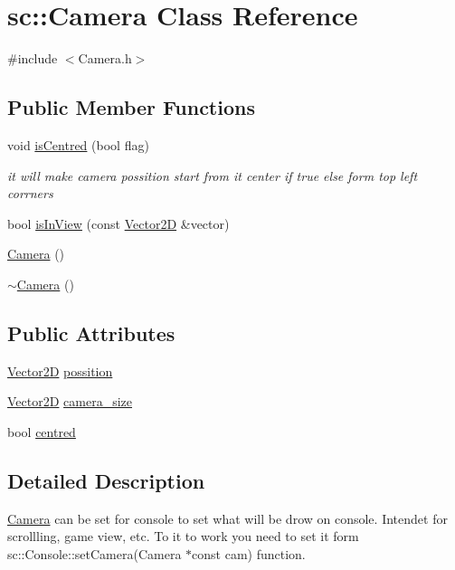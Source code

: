 \hypertarget{classsc_1_1_camera}{}\section{sc\+::Camera Class Reference}
\label{classsc_1_1_camera}


{\ttfamily \#include $<$Camera.\+h$>$}

\subsection*{Public Member Functions}
\begin{DoxyCompactItemize}
\item 
void \mbox{\hyperlink{classsc_1_1_camera_a11435e666d8d36637823263b1d494ffb}{is\+Centred}} (bool flag)
\begin{DoxyCompactList}\small\item\em it will make camera possition start from it center if true else form top left corrners \end{DoxyCompactList}\item 
bool \mbox{\hyperlink{classsc_1_1_camera_a6b737853f54514a30700f4ff27433995}{is\+In\+View}} (const \mbox{\hyperlink{classsc_1_1_vector2_d}{Vector2D}} \&vector)
\item 
\mbox{\hyperlink{classsc_1_1_camera_a01f94c3543f56ede7af49dc778f19331}{Camera}} ()
\item 
\mbox{\hyperlink{classsc_1_1_camera_ad1897942d0ccf91052386388a497349f}{$\sim$\+Camera}} ()
\end{DoxyCompactItemize}
\subsection*{Public Attributes}
\begin{DoxyCompactItemize}
\item 
\mbox{\hyperlink{classsc_1_1_vector2_d}{Vector2D}} \mbox{\hyperlink{classsc_1_1_camera_a521be7f945f1d565e766162f39aa99ab}{possition}}
\item 
\mbox{\hyperlink{classsc_1_1_vector2_d}{Vector2D}} \mbox{\hyperlink{classsc_1_1_camera_a1f87bf4e63d05ca2e86ac4acf4d01671}{camera\+\_\+size}}
\item 
bool \mbox{\hyperlink{classsc_1_1_camera_a2d6647a30a10807d10d75a165b73b844}{centred}}
\end{DoxyCompactItemize}


\subsection{Detailed Description}
\mbox{\hyperlink{classsc_1_1_camera}{Camera}} can be set for console to set what will be drow on console. Intendet for scrollling, game view, etc. To it to work you need to set it form sc\+::\+Console\+::set\+Camera(\+Camera $\ast$const cam) function. 

